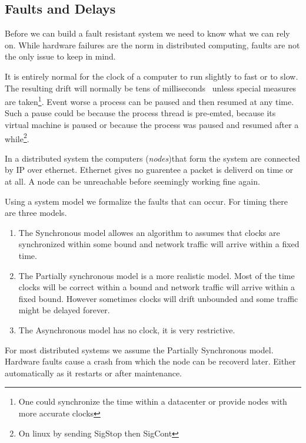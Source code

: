\subsection{Faults and Delays}
Before we can build a fault resistant system we need to know what we can rely on. While hardware failures are the norm in distributed computing, faults are not the only issue to keep in mind. 

It is entirely normal for the clock of a computer to run slightly to fast or to slow. The resulting drift will normally be tens of milliseconds~\cite{time} unless special measures are taken\footnote{One could synchronize the time within a datacenter or provide nodes with more accurate clocks}. Event worse a process can be paused and then resumed at any time. Such a pause could be because the process thread is pre-emted, because its virtual machine is paused or because the process was paused and resumed after a while\footnote{On linux by sending SigStop then SigCont}. 

In a distributed system the computers (\textit{nodes})that form the system are connected by IP over ethernet. Ethernet gives no guarentee a packet is deliverd on time or at all. A node can be unreachable before seemingly working fine again.

Using a system model we formalize the faults that can occur. For timing there are three models. 
\begin{enumerate}
	\item The Synchronous model allowes an algorithm to assumes that clocks are synchronized within some bound and network traffic will arrive within a fixed time.
	\item The Partially synchronous model is a more realistic model. Most of the time clocks will be correct within a bound and network traffic will arrive within a fixed bound. However sometimes clocks will drift unbounded and some traffic might be delayed forever.
	\item The Asynchronous model has no clock, it is very restrictive.
\end{enumerate}

For most distributed systems we assume the Partially Synchronous model. Hardware faults cause a crash from which the node can be recoverd later. Either automatically as it restarts or after maintenance.
